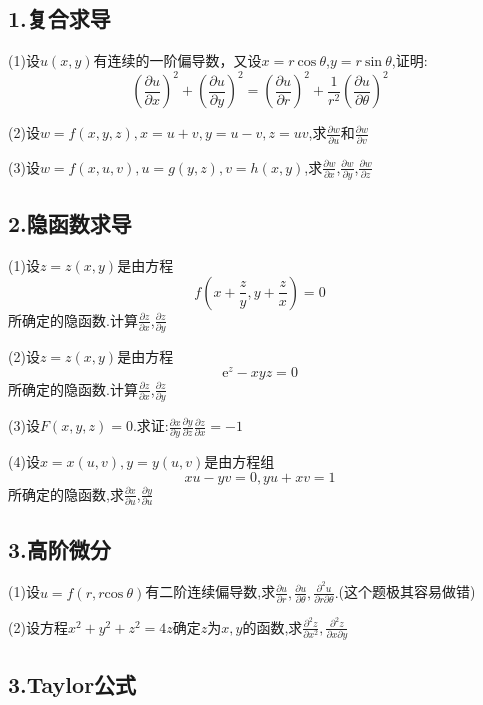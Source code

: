 \documentclass{ctexart}
\begin{document}
\subsection*{1.复合求导}


\noindent (1)设$u(x,y)$有连续的一阶偏导数，又设$x=r\ \mathrm{cos}\ \theta$,$y=r\ \mathrm{sin}\ \theta$,证明:
$$(\frac{\partial u}{\partial x})^{2}+(\frac{\partial u}{\partial y})^{2}=(\frac{\partial u}{\partial r})^{2}+\frac{1}{r^{2}}(\frac{\partial u}{\partial \theta})^{2}$$

\noindent (2)设$w=f(x,y,z),x=u+v,y=u-v,z=uv$,求$\frac{\partial w}{\partial u}$和$\frac{\partial w}{\partial v}$

\noindent (3)设$w=f(x,u,v),u=g(y,z),v=h(x,y)$,求$\frac{\partial w}{\partial x}$,$\frac{\partial w}{\partial y}$,$\frac{\partial w}{\partial z}$

\subsection*{2.隐函数求导}

\noindent (1)设$z=z(x,y)$是由方程$$f(x+\frac{z}{y},y+\frac{z}{x})=0$$所确定的隐函数.计算$\frac{\partial z}{\partial x}$,$\frac{\partial z}{\partial y}$

\noindent (2)设$z=z(x,y)$是由方程$$\mathrm{e}^{z}-xyz=0$$所确定的隐函数.计算$\frac{\partial z}{\partial x}$,$\frac{\partial z}{\partial y}$

\noindent (3)设$F(x,y,z)=0$.求证:$\frac{\partial x}{\partial y}\frac{\partial y}{\partial z}\frac{\partial z}{\partial x}=-1$

\noindent (4)设$x=x(u,v),y=y(u,v)$是由方程组$$xu-yv=0,yu+xv=1$$所确定的隐函数,求$\frac{\partial x}{\partial u}$,$\frac{\partial y}{\partial u}$


\subsection*{3.高阶微分}



\noindent (1)设$u=f(r,r\mathrm{cos}\ \theta)$有二阶连续偏导数,求$\frac{\partial u}{\partial r},\frac{\partial u}{\partial \theta},\frac{\partial^{2} u}{\partial r\partial \theta}.$(这个题极其容易做错)

\noindent (2)设方程$x^{2}+y^{2}+z^{2}=4z$确定$z$为$x,y$的函数,求$\frac{\partial^{2} z}{\partial x^{2}},\frac{\partial^{2} z}{\partial x\partial y}$

\subsection*{3.Taylor公式}
\end{document}
